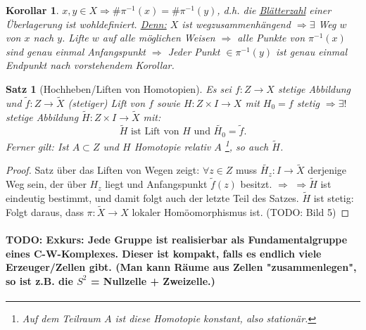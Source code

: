 \documentclass[a4paper,11pt,notitlepage]{report}
\newtheorem{theorem}{Satz}[chapter]
\newtheorem{corollary}{Korollar}[chapter]
\theoremstyle{remark}
\theoremstyle{definition}
\begin{document}
\begin{corollary}
	$x,y \in X \Rightarrow \# \pi^{-1}(x) = \# \pi^{-1}(y)$, d.h. die \underline{Blätterzahl} einer Überlagerung ist wohldefiniert.
	\newline
	\underline{Denn:} $X$ ist wegzusammenhängend $\Rightarrow \exists$ Weg $w$ von $x$ nach $y$. Lifte $w$ auf alle möglichen Weisen $\Rightarrow$ alle Punkte von $\pi^{-1}(x)$ %
	sind genau einmal Anfangspunkt $\Rightarrow$ Jeder Punkt $\in \pi^{-1}(y)$ ist genau einmal Endpunkt nach vorstehendem Korollar.	
\end{corollary}

\begin{theorem}[Hochheben/Liften von Homotopien]
	Es sei $f \colon Z \rightarrow X$ stetige Abbildung und $\widetilde{f} \colon Z \rightarrow \widetilde{X}$ (stetiger) Lift von $f$ sowie $H \colon Z \times I \rightarrow X$ mit $H_0 = f$ stetig $\Rightarrow \exists!$ stetige Abbildung $\widetilde{H} \colon Z \times I \rightarrow \widetilde{X}$ mit:
	$$\widetilde{H} \text{ ist Lift von $H$ und $\widetilde{H_0} = \widetilde{f}$.}$$
	Ferner gilt:
	\newline
	Ist $A \subset Z$ und $H$ Homotopie relativ $A$ \footnote{Auf dem Teilraum $A$ ist diese Homotopie konstant, also stationär.}, so auch $\widetilde{H}$.
\end{theorem}

\begin{proof}
	Satz über das Liften von Wegen zeigt: \newline
	$\forall z \in Z $ muss $\widetilde{H_z} \colon I \rightarrow \widetilde{X}$ derjenige Weg sein, der über $H_z$ liegt und Anfangspunkt $\widetilde{f}(z)$ besitzt. $\Rightarrow$
	\newline
	$\Rightarrow \widetilde{H}$ ist eindeutig bestimmt, und damit folgt auch der letzte Teil des Satzes. \newline
	$\widetilde{H}$ ist stetig: Folgt daraus, dass $\pi \colon \widetilde{X} \rightarrow X$ lokaler Homöomorphismus ist. (TODO: Bild 5)
\end{proof}

\paragraph{TODO: Exkurs: Jede Gruppe ist realisierbar als Fundamentalgruppe eines C-W-Komplexes. Dieser ist kompakt, falls es endlich viele Erzeuger/Zellen gibt. (Man kann Räume aus Zellen "zusammenlegen", so ist z.B. die $S^2$ = Nullzelle + Zweizelle.)}
\end{document}
